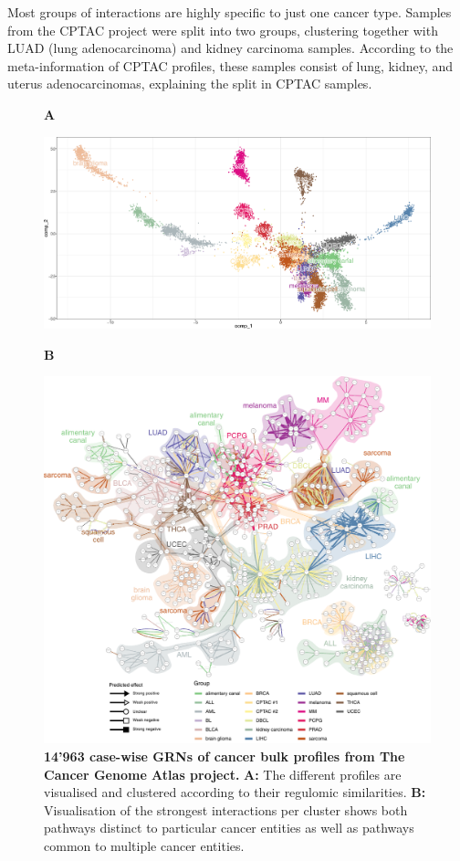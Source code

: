 Most groups of interactions are highly specific to just one cancer type. Samples from the CPTAC project were split into two groups, clustering together with LUAD (lung adenocarcinoma) and kidney carcinoma samples. According to the meta-information of CPTAC profiles, these samples consist of lung, kidney, and uterus adenocarcinomas, explaining the split in CPTAC samples.



\begin{figure}[htb!]
	{\raggedright\textbf{A}}
	\begin{center}\includegraphics[width=.8\linewidth]{fig/tcga/plot_fr_cropped.png}\end{center}
	{\raggedright\textbf{B}}
	\begin{center}\includegraphics[width=.85\linewidth]{fig/tcga/grouped_interactions_2.pdf}\end{center}
	\caption{
		\textbf{14'963 case-wise GRNs of cancer bulk profiles from The Cancer Genome Atlas project.}
		\textbf{A:} The different profiles are visualised and clustered according to their regulomic similarities.
		\textbf{B:} Visualisation of the strongest interactions per cluster shows both pathways distinct to particular cancer entities as well as pathways common to multiple cancer entities.
	}
	\label{fig:tcga}
\end{figure}


